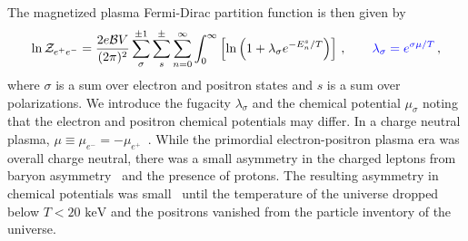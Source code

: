 \documentclass[a4paper]{article}
\newcommand*{\keV}{\text{ keV}}
\begin{document}
The magnetized plasma Fermi-Dirac partition function is then given by
\begin{align}
    \label{partition}
    \ln{\cal Z}_{e^{+}e^{-}}=\frac{2e{\cal B}V}{(2\pi)^{2}}\sum_{\sigma}^{\pm1}\sum_{s}^{\pm}\sum_{n=0}^{\infty}\int_{0}^{\infty}\left[\ln\left(1+\lambda_{\sigma}e^{-E_{n}^{s}/T}\right)\right]\,,\qquad{\color{blue}\lambda_{\sigma}=e^{{\sigma}\mu/T}}\,,
\end{align}
where $\sigma$ is a sum over electron and positron states and $s$ is a sum over polarizations. We introduce the fugacity $\lambda_{\sigma}$ and the chemical potential $\mu_{\sigma}$ noting that the electron and positron chemical potentials may differ. In a charge neutral plasma, $\mu\equiv\mu_{e^{-}}=-\mu_{e^{+}}$~\cite{elze1980relativistic}. While the primordial electron-positron plasma era was overall charge neutral, there was a small asymmetry in the charged leptons from baryon asymmetry~\cite{canetti2012matter} and the presence of protons. The resulting asymmetry in chemical potentials was small~\cite{rafelski2023short} until the temperature of the universe dropped below $T<20\keV$ and the positrons vanished from the particle inventory of the universe.
\end{document}
